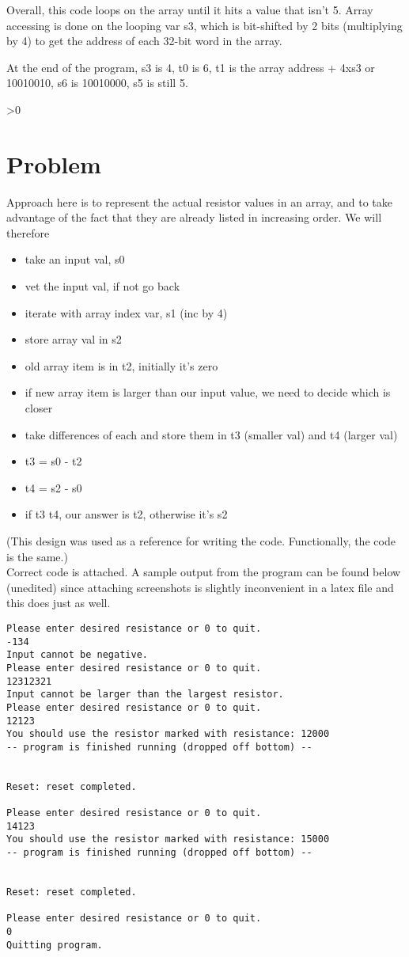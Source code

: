 \documentclass{article}
\newcounter{problemnumber}\setcounter{problemnumber}{1}
\newcommand{\problem}[1][-1]{
    \setcounter{partnumber}{1}
    \ifnum#1>0
        \setcounter{problemnumber}{#1}
    \fi
    \section*{Problem \arabic{problemnumber}}
    \stepcounter{problemnumber}
}
\newcounter{partnumber}\setcounter{partnumber}{1}
\begin{document}
Overall, this code loops on the array until it hits a value that isn't 5.
Array accessing is done on the looping var s3, which is bit-shifted by 2
bits (multiplying by 4) to get the address of each 32-bit word in the array.

At the end of the program, s3 is 4, t0 is 6, t1 is the array address + 4xs3 or
10010010, s6 is 10010000, s5 is still 5. 

\newpage
\problem

Approach here is to represent the actual resistor values in an array, and to
take advantage of the fact that they are already listed in increasing order.
We will therefore \\
\begin{itemize}
	\item take an input val, s0
	\item vet the input val, if not go back
	\item iterate with array index var, s1 (inc by 4)
	\item store array val in s2
	\item old array item is in t2, initially it's zero
	\item if new array item is larger than our input value, we need to
		decide which is closer
	\item take differences of each and store them in t3 (smaller val) and
		t4 (larger val)
	\item t3 = s0 - t2
	\item t4 = s2 - s0
	\item if t3 \< t4, our answer is t2, otherwise it's s2
\end{itemize}
(This design was used as a reference for writing the code. Functionally,
the code is the same.) \\

Correct code is attached. A sample output from the program can be found
below (unedited) since attaching screenshots is slightly inconvenient
in a latex file and this does just as well.

\begin{lstlisting}
Please enter desired resistance or 0 to quit.
-134
Input cannot be negative.
Please enter desired resistance or 0 to quit.
12312321
Input cannot be larger than the largest resistor.
Please enter desired resistance or 0 to quit.
12123
You should use the resistor marked with resistance: 12000
-- program is finished running (dropped off bottom) --


Reset: reset completed.

Please enter desired resistance or 0 to quit.
14123
You should use the resistor marked with resistance: 15000
-- program is finished running (dropped off bottom) --


Reset: reset completed.

Please enter desired resistance or 0 to quit.
0
Quitting program.
\end{lstlisting}
\end{document}
